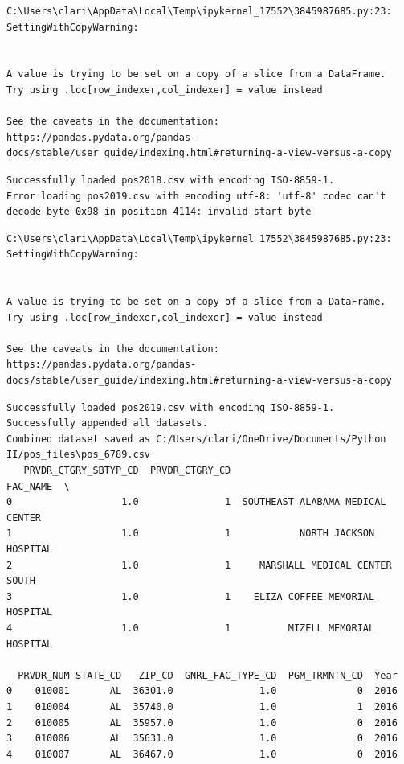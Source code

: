 \documentclass[
  letterpaper,
  DIV=11,
  numbers=noendperiod]{scrartcl}
\begin{document}
\begin{verbatim}
C:\Users\clari\AppData\Local\Temp\ipykernel_17552\3845987685.py:23: SettingWithCopyWarning:


A value is trying to be set on a copy of a slice from a DataFrame.
Try using .loc[row_indexer,col_indexer] = value instead

See the caveats in the documentation: https://pandas.pydata.org/pandas-docs/stable/user_guide/indexing.html#returning-a-view-versus-a-copy
\end{verbatim}

\begin{verbatim}
Successfully loaded pos2018.csv with encoding ISO-8859-1.
Error loading pos2019.csv with encoding utf-8: 'utf-8' codec can't decode byte 0x98 in position 4114: invalid start byte
\end{verbatim}

\begin{verbatim}
C:\Users\clari\AppData\Local\Temp\ipykernel_17552\3845987685.py:23: SettingWithCopyWarning:


A value is trying to be set on a copy of a slice from a DataFrame.
Try using .loc[row_indexer,col_indexer] = value instead

See the caveats in the documentation: https://pandas.pydata.org/pandas-docs/stable/user_guide/indexing.html#returning-a-view-versus-a-copy
\end{verbatim}

\begin{verbatim}
Successfully loaded pos2019.csv with encoding ISO-8859-1.
Successfully appended all datasets.
Combined dataset saved as C:/Users/clari/OneDrive/Documents/Python II/pos_files\pos_6789.csv
   PRVDR_CTGRY_SBTYP_CD  PRVDR_CTGRY_CD                          FAC_NAME  \
0                   1.0               1  SOUTHEAST ALABAMA MEDICAL CENTER   
1                   1.0               1            NORTH JACKSON HOSPITAL   
2                   1.0               1     MARSHALL MEDICAL CENTER SOUTH   
3                   1.0               1    ELIZA COFFEE MEMORIAL HOSPITAL   
4                   1.0               1          MIZELL MEMORIAL HOSPITAL   

  PRVDR_NUM STATE_CD   ZIP_CD  GNRL_FAC_TYPE_CD  PGM_TRMNTN_CD  Year  
0    010001       AL  36301.0               1.0              0  2016  
1    010004       AL  35740.0               1.0              1  2016  
2    010005       AL  35957.0               1.0              0  2016  
3    010006       AL  35631.0               1.0              0  2016  
4    010007       AL  36467.0               1.0              0  2016  
\end{verbatim}
\end{document}

